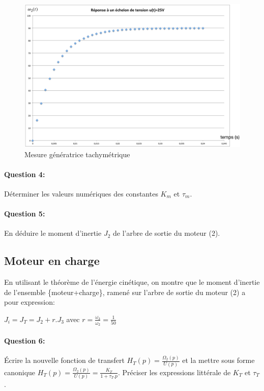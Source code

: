 \begin{figure}[!h]
 \centering\includegraphics[width=0.8\linewidth]{img/fig_moteur_charge_02}
  \caption{Mesure génératrice tachymétrique}
 \label{fig_moteur_charge_02}
\end{figure}

\paragraph{Question 4:} Déterminer les valeurs numériques des constantes $K_m$ et $\tau_m$.

\paragraph{Question 5:} En déduire le moment d'inertie $J_2$ de l'arbre de sortie du moteur (2).

\newpage

\subsection{Moteur en charge}

En utilisant le théorème de l'énergie cinétique, on montre que le moment d'inertie de l'ensemble \{moteur+charge\}, ramené sur l'arbre de sortie du moteur (2) a pour expression:

$J_i=J_T=J_2+r.J_3$ avec $r=\frac{\omega_3}{\omega_2}=\frac{1}{50}$

\paragraph{Question 6:} Écrire la nouvelle fonction de transfert
$H_T(p)=\frac{\Omega_2(p)}{U(p)}$ et la mettre sous forme canonique
$H_T(p)=\frac{\Omega_2(p)}{U(p)}=\frac{K_T}{1+\tau_T.p}$. Préciser les expressions littérale de $K_T$ et $\tau_T$.

